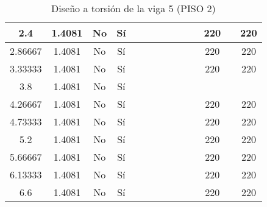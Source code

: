 \begin{table}[H]
{\begin{tabular}{|c|c|c|c|c|c|c|c|c|c|c|c|c|c|}
\hline
2.4 & 1.4081 & No  & Sí  &     &     &     &     &     &     &     & 220 &     & 220 \bigstrut\\
\hline
2.86667 & 1.4081 & No  & Sí  &     &     &     &     &     &     &     & 220 &     & 220 \bigstrut\\
\hline
3.33333 & 1.4081 & No  & Sí  &     &     &     &     &     &     &     & 220 &     & 220 \bigstrut\\
\hline
3.8 & 1.4081 & No  & Sí  &     &     &     &     &     &     &     &     &     &  \bigstrut\\
\hline
4.26667 & 1.4081 & No  & Sí  &     &     &     &     &     &     &     & 220 &     & 220 \bigstrut\\
\hline
4.73333 & 1.4081 & No  & Sí  &     &     &     &     &     &     &     & 220 &     & 220 \bigstrut\\
\hline
5.2 & 1.4081 & No  & Sí  &     &     &     &     &     &     &     & 220 &     & 220 \bigstrut\\
\hline
5.66667 & 1.4081 & No  & Sí  &     &     &     &     &     &     &     & 220 &     & 220 \bigstrut\\
\hline
6.13333 & 1.4081 & No  & Sí  &     &     &     &     &     &     &     & 220 &     & 220 \bigstrut\\
\hline
6.6 & 1.4081 & No  & Sí  &     &     &     &     &     &     &     & 220 &     & 220 \bigstrut\\
\hline
\end{tabular}%

%
  }
      \caption{Diseño a torsión de la viga 5 (PISO 2) }
  \label{tab:T VG5 P2 }%
\end{table}%
